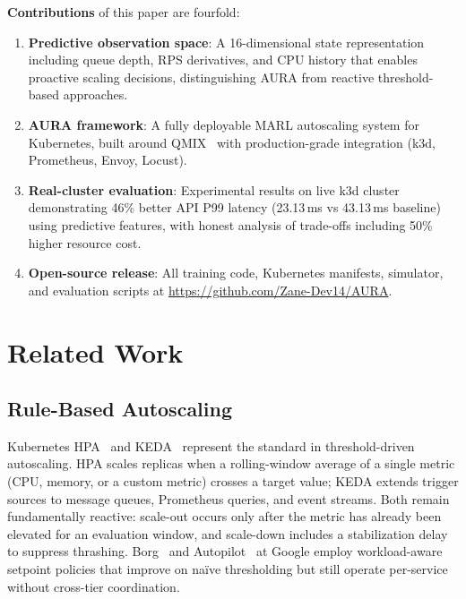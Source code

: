 \documentclass[conference]{IEEEtran}
\begin{document}
\textbf{Contributions} of this paper are fourfold:
\begin{enumerate}
  \item \textbf{Predictive observation space}: A 16-dimensional state
        representation including queue depth, RPS derivatives, and CPU
        history that enables proactive scaling decisions, distinguishing
        AURA from reactive threshold-based approaches.
  \item \textbf{AURA framework}: A fully deployable MARL autoscaling
        system for Kubernetes, built around QMIX~\cite{Rashid2018} with
        production-grade integration (k3d, Prometheus, Envoy, Locust).
  \item \textbf{Real-cluster evaluation}: Experimental results on live
        k3d cluster demonstrating 46\% better API P99 latency (23.13\,ms
        vs 43.13\,ms baseline) using predictive features, with honest
        analysis of trade-offs including 50\% higher resource cost.
  \item \textbf{Open-source release}: All training code, Kubernetes
        manifests, simulator, and evaluation scripts at
        \url{https://github.com/Zane-Dev14/AURA}.
\end{enumerate}

\section{Related Work}
\label{sec:related}

\subsection{Rule-Based Autoscaling}

Kubernetes HPA~\cite{KubernetesHPA} and KEDA~\cite{KEDA} represent
the standard in threshold-driven autoscaling. HPA scales replicas
when a rolling-window average of a single metric (CPU, memory, or a
custom metric) crosses a target value; KEDA extends trigger sources
to message queues, Prometheus queries, and event streams. Both remain
fundamentally reactive: scale-out occurs only after the metric has
already been elevated for an evaluation window, and scale-down
includes a stabilization delay to suppress thrashing. Borg~\cite{Verma2015}
and Autopilot~\cite{Rzadca2020} at Google employ workload-aware
setpoint policies that improve on na\"ive thresholding but still
operate per-service without cross-tier coordination.
\end{document}
